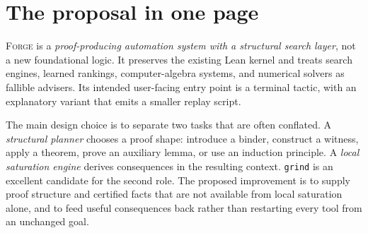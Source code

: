 \documentclass[11pt,a4paper]{article}
\theoremstyle{definition}
\newcommand{\forge}{\textsc{Forge}}
\newcommand{\grind}{\texttt{grind}}
\begin{document}
\begin{abstract}
A substantially more capable successor to \grind{} should not merely increase its search limits or rename a portfolio of existing tactics. It should retain \grind{} as a fast, trusted proof-producing core while addressing three different sources of failure: missing proof structure, missing intermediate mathematical facts, and missing existential constructions. This report proposes \forge{}, a typed, scope-aware coordination layer around structural AND/OR search, goal-directed theorem application, induction with generalization, witness synthesis, and exact nonlinear certificates. The concrete arithmetic design includes rational quadratic decomposition, finite-cone linear programming with exact repair, multivariate Bernstein subdivision, and univariate square-factor/Sturm certificates that tolerate exact zeros. Polynomial recurrence synthesis and affine witness synthesis provide executable examples of structure-producing automation.

The report specifies algorithms, soundness arguments, integration contracts, resource accounting, libraries, trust modes, and an implementation sequence. Six components are prototyped and tested in Python; stored certificates can be rechecked without importing SciPy, NumPy, or SymPy. The experiments isolate useful mechanisms but are deliberately not presented as evidence that the unimplemented Lean tactic outperforms \grind{}. A separate evaluation protocol explains how to establish that claim fairly.
\end{abstract}
\tableofcontents
\clearpage
\section{The proposal in one page}

\forge{} is a \emph{proof-producing automation system with a structural search layer}, not a new foundational logic. It preserves the existing Lean kernel and treats search engines, learned rankings, computer-algebra systems, and numerical solvers as fallible advisers. Its intended user-facing entry point is a terminal tactic, with an explanatory variant that emits a smaller replay script.

The main design choice is to separate two tasks that are often conflated. A \emph{structural planner} chooses a proof shape: introduce a binder, construct a witness, apply a theorem, prove an auxiliary lemma, or use an induction principle. A \emph{local saturation engine} derives consequences in the resulting context. \grind{} is an excellent candidate for the second role. The proposed improvement is to supply proof structure and certified facts that are not available from local saturation alone, and to feed useful consequences back rather than restarting every tool from an unchanged goal.
\end{document}
